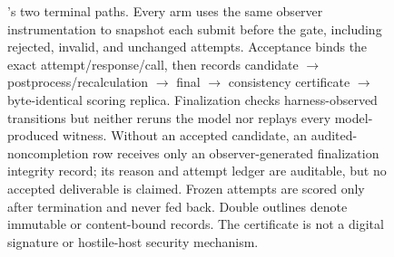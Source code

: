 \begin{figure}[t]
\caption{\method's two terminal paths. Every arm uses the same observer
instrumentation to snapshot each submit before the gate, including rejected,
invalid, and unchanged attempts. Acceptance binds the
exact attempt/response/call, then records candidate $\rightarrow$
postprocess/recalculation $\rightarrow$ final $\rightarrow$ consistency
certificate $\rightarrow$ byte-identical scoring replica. Finalization checks
harness-observed transitions but neither reruns the model nor replays every
model-produced witness. Without an accepted candidate, an audited-noncompletion
row receives only an observer-generated finalization integrity record; its
reason and attempt ledger are auditable, but no accepted deliverable is claimed.
Frozen attempts are scored only after termination and never fed back. Double
outlines denote immutable or content-bound records. The certificate is not a
digital signature or hostile-host security mechanism.}
\label{fig:pipeline}
\end{figure}
